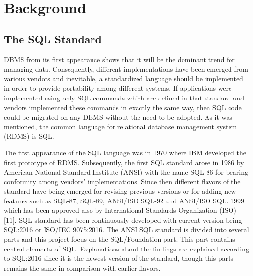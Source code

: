 
\chapter{Background}

\section{The SQL Standard }
DBMS from its first appearance shows that it will be the dominant trend for managing data. Consequently, different implementations have been emerged from various vendors and inevitable, a standardized language should be implemented in order to provide portability among different systems. If applications were implemented using only SQL commands which are defined in that standard and vendors implemented these commands in exactly the same way, then SQL code could be migrated on any DBMS without the need to be adopted. As it was mentioned, the common language for relational database management system (RDMS) is SQL. 

The first appearance of the SQL language was in 1970 where IBM developed the first prototype of RDMS. Subsequently, the first SQL standard arose in 1986 by American National Standard Institute (ANSI) with the name SQL-86 for bearing conformity among vendors’ implementations. Since then different flavors of the standard have being emerged for revising previous versions or for adding new features such as SQL-87, SQL-89, ANSI/ISO SQL-92 and  ANSI/ISO SQL: 1999 which has been approved also by International Standards Organization (ISO) [11]. SQL standard has been continuously developed with current version being SQL:2016 or ISO/IEC 9075:2016. The ANSI SQL standard is divided into several parts and this project focus on the SQL/Foundation part. This part contains central elements of SQL. Explanations about the findings are explained according to SQL:2016 since it is the newest version of the standard, though this parts  remains the same in comparison with earlier flavors. 


